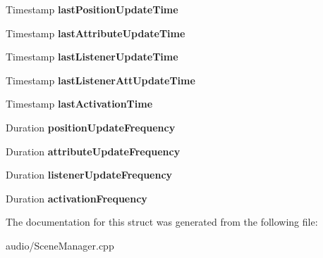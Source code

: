 \begin{DoxyCompactItemize}
\item 
Timestamp {\bfseries last\+Position\+Update\+Time}\hypertarget{structAudio_1_1____impl_1_1SceneManagerData_a2ffa56c8c983e0c0afe28ccc5c09aaa1}{}\label{structAudio_1_1____impl_1_1SceneManagerData_a2ffa56c8c983e0c0afe28ccc5c09aaa1}

\item 
Timestamp {\bfseries last\+Attribute\+Update\+Time}\hypertarget{structAudio_1_1____impl_1_1SceneManagerData_a02a137cf4680b067f47bfe105cf3e8d6}{}\label{structAudio_1_1____impl_1_1SceneManagerData_a02a137cf4680b067f47bfe105cf3e8d6}

\item 
Timestamp {\bfseries last\+Listener\+Update\+Time}\hypertarget{structAudio_1_1____impl_1_1SceneManagerData_a98b0dfff9042d0aed22a469385ad13b4}{}\label{structAudio_1_1____impl_1_1SceneManagerData_a98b0dfff9042d0aed22a469385ad13b4}

\item 
Timestamp {\bfseries last\+Listener\+Att\+Update\+Time}\hypertarget{structAudio_1_1____impl_1_1SceneManagerData_a81b8cca37beec1bb9058dbcc0af1c1bb}{}\label{structAudio_1_1____impl_1_1SceneManagerData_a81b8cca37beec1bb9058dbcc0af1c1bb}

\item 
Timestamp {\bfseries last\+Activation\+Time}\hypertarget{structAudio_1_1____impl_1_1SceneManagerData_ad820c2ac98756219879c27eeca416399}{}\label{structAudio_1_1____impl_1_1SceneManagerData_ad820c2ac98756219879c27eeca416399}

\item 
Duration {\bfseries position\+Update\+Frequency}\hypertarget{structAudio_1_1____impl_1_1SceneManagerData_aabab48ef62393d0d48473eb5d59af524}{}\label{structAudio_1_1____impl_1_1SceneManagerData_aabab48ef62393d0d48473eb5d59af524}

\item 
Duration {\bfseries attribute\+Update\+Frequency}\hypertarget{structAudio_1_1____impl_1_1SceneManagerData_a0c0b29c53c022c66a39c2dbbb18c5abb}{}\label{structAudio_1_1____impl_1_1SceneManagerData_a0c0b29c53c022c66a39c2dbbb18c5abb}

\item 
Duration {\bfseries listener\+Update\+Frequency}\hypertarget{structAudio_1_1____impl_1_1SceneManagerData_a4c35b0a5d10a600da8238f4da7e11bd6}{}\label{structAudio_1_1____impl_1_1SceneManagerData_a4c35b0a5d10a600da8238f4da7e11bd6}

\item 
Duration {\bfseries activation\+Frequency}\hypertarget{structAudio_1_1____impl_1_1SceneManagerData_a2b36d7ddb8b62fe4cbf161fd71ad48c5}{}\label{structAudio_1_1____impl_1_1SceneManagerData_a2b36d7ddb8b62fe4cbf161fd71ad48c5}

\end{DoxyCompactItemize}


The documentation for this struct was generated from the following file\+:\begin{DoxyCompactItemize}
\item 
audio/Scene\+Manager.\+cpp\end{DoxyCompactItemize}
